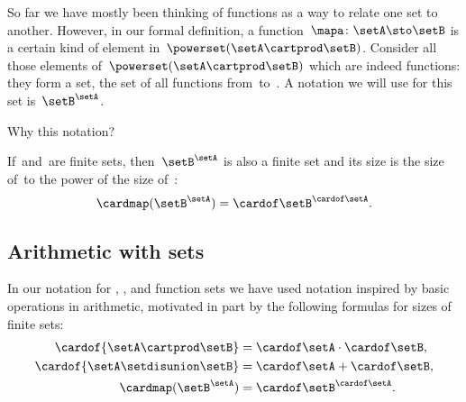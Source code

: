 So far we have mostly been thinking of functions as a way to relate one set to another.
However, in our formal definition, a function~$\mapa \colon \setA \sto \setB$ is a certain kind of element in~$\powerset (\setA \cartprod \setB)$.
Consider all those elements of~$\powerset (\setA \cartprod \setB)$ which are indeed functions: they form a set, the set of all functions from~\setA to~\setB.
A notation we will use for this set is~$\setB^{\setA}$.

Why this notation?

If~\setA and~\setB are finite sets, then~$\setB^{\setA}$ is also a finite set and its size is the size of~\setB to the power of the size of~\setA:
\begin{equation}
    \cardmap(\setB^{\setA}) = {\cardof\setB} ^ {\cardof \setA}.
\end{equation}

\subsection{Arithmetic with sets}

In our notation for , , and function sets we have used notation inspired by basic operations in arithmetic, motivated in part by the following formulas for sizes of finite sets:
\begin{align}
    \cardof{\setA \cartprod \setB}     & = \cardof \setA \cdot \cardof \setB, \\
    \cardof{ \setA \setdisunion \setB} & = \cardof \setA + \cardof \setB, \\
    \cardmap(\setB^{\setA})            & = {\cardof\setB}^{\cardof\setA}.
\end{align}

